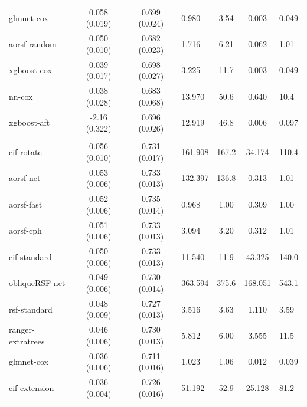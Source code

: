 \documentclass[twoside,11pt]{article}\usepackage[]{graphicx}\usepackage[]{xcolor}
\newenvironment{knitrout}{}{} %
\begin{document}
\begin{knitrout}
\begin{longtable}{lcclccl}
\hspace{1em}glmnet-cox & 0.058 (0.019) & 0.699 (0.024) & 0.980 & 3.54 & 0.003 & 0.049\\
\hspace{1em}aorsf-random & 0.050 (0.010) & 0.682 (0.023) & 1.716 & 6.21 & 0.062 & 1.01\\
\hspace{1em}xgboost-cox & 0.039 (0.017) & 0.698 (0.027) & 3.225 & 11.7 & 0.003 & 0.049\\
\hspace{1em}nn-cox & 0.038 (0.028) & 0.683 (0.068) & 13.970 & 50.6 & 0.640 & 10.4\\
\hspace{1em}xgboost-aft & -2.16 (0.322) & 0.696 (0.026) & 12.919 & 46.8 & 0.006 & 0.097\\
\addlinespace[0.3em]
\hline
\multicolumn{7}{l}{\textit{\textbf{Heart Transplant; graft-loss or death, n = 3787, p = 52}}}\\
\hline
\hspace{1em}cif-rotate & 0.056 (0.010) & 0.731 (0.017) & 161.908 & 167.2 & 34.174 & 110.4\\
\hspace{1em}aorsf-net & 0.053 (0.006) & 0.733 (0.013) & 132.397 & 136.8 & 0.313 & 1.01\\
\hspace{1em}aorsf-fast & 0.052 (0.006) & 0.735 (0.014) & 0.968 & 1.00 & 0.309 & 1.00\\
\hspace{1em}aorsf-cph & 0.051 (0.006) & 0.733 (0.013) & 3.094 & 3.20 & 0.312 & 1.01\\
\hspace{1em}cif-standard & 0.050 (0.006) & 0.733 (0.013) & 11.540 & 11.9 & 43.325 & 140.0\\
\hspace{1em}obliqueRSF-net & 0.049 (0.006) & 0.730 (0.014) & 363.594 & 375.6 & 168.051 & 543.1\\
\hspace{1em}rsf-standard & 0.048 (0.009) & 0.727 (0.013) & 3.516 & 3.63 & 1.110 & 3.59\\
\hspace{1em}ranger-extratrees & 0.046 (0.006) & 0.730 (0.013) & 5.812 & 6.00 & 3.555 & 11.5\\
\hspace{1em}glmnet-cox & 0.036 (0.006) & 0.711 (0.016) & 1.023 & 1.06 & 0.012 & 0.039\\
\hspace{1em}cif-extension & 0.036 (0.004) & 0.726 (0.016) & 51.192 & 52.9 & 25.128 & 81.2\\

\end{longtable}
\end{knitrout}
\end{document}
